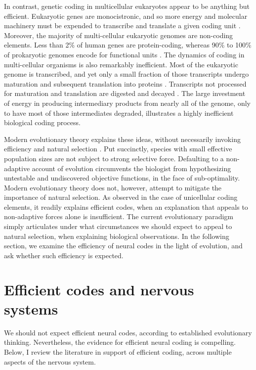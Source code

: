 \documentclass[twocolumn]{article}
\begin{document}
In contrast, genetic coding in multicellular eukaryotes appear to be anything but efficient. Eukaryotic genes are monocistronic, and so more energy and molecular machinery must be expended to transcribe and translate a given coding unit \cite{kozak_1999}. Moreover, the majority of multi-cellular eukaryotic genomes are non-coding elements. Less than 2\% of human genes are protein-coding, whereas  90\% to 100\% of prokaryotic genomes encode for functional units \cite{milo2016cell}. The dynamics of coding in multi-cellular organisms is also remarkably inefficient. Most of the eukaryotic genome is transcribed, and yet only a small fraction of those transcripts undergo maturation and subsequent translation into proteins \cite{menet_rosbash_2012}. Transcripts not processed for maturation and translation are digested and decayed \cite{mcnicoll_neugebauer_2014}. The large investment of energy in producing intermediary products from nearly all of the genome, only to have most of those intermediates degraded, illustrates a highly inefficient biological coding process. 

Modern evolutionary theory explains these ideas, without necessarily invoking efficiency and natural selection \cite{lynch2007origins}. Put succinctly, species with small effective population sizes are not subject to strong selective force. Defaulting to a non-adaptive account of evolution circumvents the biologist from hypothesizing untestable and undiscovered objective functions, in the face of sub-optimality. Modern evolutionary theory does not, however, attempt to mitigate the importance of natural selection. As observed in the case of unicellular coding elements, it readily explains efficient codes, when an explanation that appeals to non-adaptive forces alone is insufficient. The current evolutionary paradigm simply articulates under what circumstances we should expect to appeal to natural selection, when explaining biological observations. In the following section, we examine the efficiency of neural codes in the light of evolution, and ask whether such efficiency is expected. 

\section{Efficient codes and nervous systems}
We should not expect efficient neural codes, according to established evolutionary thinking. Nevertheless, the evidence for efficient neural coding is compelling. Below, I review the literature in support of efficient coding, across multiple aspects of the nervous system. 
\end{document}
